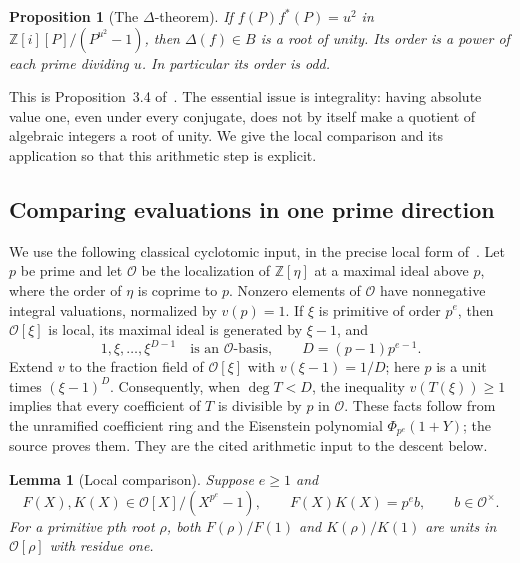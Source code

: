 \documentclass[11pt]{article}
\newtheorem{proposition}[theorem]{Proposition}
\newtheorem{lemma}[theorem]{Lemma}
\begin{document}
\begin{proposition}[The $\Delta$-theorem]%
\label{prop:late-delta}
If $f(P)f^{*}(P)=u^{2}$ in $\mathbb Z[i][P]/(P^{u^{2}}-1)$, then
$\Delta(f)\in B$ is a root of unity. Its order is a power of each
prime dividing $u$. In particular its order is odd.
\end{proposition}

This is Proposition~3.4 of~\cite{circulant-source}. The essential issue
is integrality: having absolute value one, even under every conjugate,
does not by itself make a quotient of algebraic integers a root of unity.
We give the local comparison and its application so that this arithmetic
step is explicit.

\subsection{Comparing evaluations in one prime direction}

We use the following classical cyclotomic input, in the precise local
form of~\cite[Lemma~2.1]{circulant-source}. Let $p$ be prime and let
$\mathcal O$ be the localization of $\mathbb Z[\eta]$ at a maximal ideal
above $p$, where the order of $\eta$ is coprime to $p$. Nonzero elements
of $\mathcal O$ have nonnegative integral valuations, normalized by
$v(p)=1$. If $\xi$ is primitive of order $p^{e}$, then
$\mathcal O[\xi]$ is local, its maximal ideal is generated by
$\xi-1$, and
\[
 1,\xi,\ldots,\xi^{D-1}\quad\text{is an }\mathcal O\text{-basis},
 \qquad D=(p-1)p^{e-1}.
\]
Extend $v$ to the fraction field of $\mathcal O[\xi]$ with
$v(\xi-1)=1/D$; here $p$ is a unit times ${(\xi-1)}^{D}$.
Consequently, when $\deg T<D$, the inequality $v(T(\xi))\geq1$
implies that every coefficient of $T$ is divisible by $p$ in
$\mathcal O$. These facts follow from the unramified coefficient ring
and the Eisenstein polynomial $\Phi_{p^{e}}(1+Y)$; the source proves them.
They are the cited arithmetic input to the descent below.

\begin{lemma}[Local comparison]%
\label{lem:late-comparison}
Suppose $e\geq1$ and
\[
 F(X),K(X)\in\mathcal O[X]/(X^{p^{e}}-1),\qquad
 F(X)K(X)=p^{e} b,\qquad b\in\mathcal O^\times.
\]
For a primitive $p$th root $\rho$, both $F(\rho)/F(1)$ and
$K(\rho)/K(1)$ are units in $\mathcal O[\rho]$ with residue one.
\end{lemma}
\end{document}
